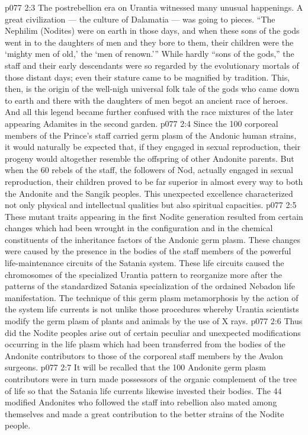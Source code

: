 \vs p077 2:3 The postrebellion era on Urantia witnessed many unusual happenings. A great civilization --- the culture of Dalamatia --- was going to pieces. “The Nephilim (Nodites) were on earth in those days, and when these sons of the gods went in to the daughters of men and they bore to them, their children were the ‘mighty men of old,’ the ‘men of renown.’” While hardly “sons of the gods,” the staff and their early descendants were so regarded by the evolutionary mortals of those distant days; even their stature came to be magnified by tradition. This, then, is the origin of the well\hyp{}nigh universal folk tale of the gods who came down to earth and there with the daughters of men begot an ancient race of heroes. And all this legend became further confused with the race mixtures of the later appearing Adamites in the second garden.
\vs p077 2:4 Since the 100 corporeal members of the Prince’s staff carried germ plasm of the Andonic human strains, it would naturally be expected that, if they engaged in sexual reproduction, their progeny would altogether resemble the offspring of other Andonite parents. But when the 60 rebels of the staff, the followers of Nod, actually engaged in sexual reproduction, their children proved to be far superior in almost every way to both the Andonite and the Sangik peoples. This unexpected excellence characterized not only physical and intellectual qualities but also spiritual capacities.
\vs p077 2:5 These mutant traits appearing in the first Nodite generation resulted from certain changes which had been wrought in the configuration and in the chemical constituents of the inheritance factors of the Andonic germ plasm. These changes were caused by the presence in the bodies of the staff members of the powerful life\hyp{}maintenance circuits of the Satania system. These life circuits caused the chromosomes of the specialized Urantia pattern to reorganize more after the patterns of the standardized Satania specialization of the ordained Nebadon life manifestation. The technique of this germ plasm metamorphosis by the action of the system life currents is not unlike those procedures whereby Urantia scientists modify the germ plasm of plants and animals by the use of X rays.
\vs p077 2:6 Thus did the Nodite peoples arise out of certain peculiar and unexpected modifications occurring in the life plasm which had been transferred from the bodies of the Andonite contributors to those of the corporeal staff members by the Avalon surgeons.
\vs p077 2:7 \pc It will be recalled that the 100 Andonite germ plasm contributors were in turn made possessors of the organic complement of the tree of life so that the Satania life currents likewise invested their bodies. The 44 modified Andonites who followed the staff into rebellion also mated among themselves and made a great contribution to the better strains of the Nodite people.
